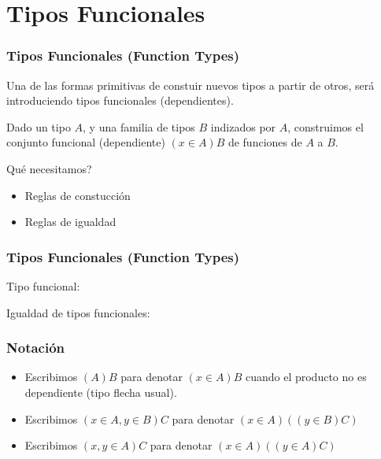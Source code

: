 \documentclass{beamer}
\begin{document}
\section{Tipos Funcionales}
\begin{frame}\frametitle{Tipos Funcionales (Function Types)}

  Una de las formas primitivas de constuir nuevos tipos a partir de otros,
  ser\'a introduciendo tipos funcionales \pause (dependientes).
  \pause

  Dado un tipo $A$, y una familia de tipos $B$ indizados por $A$,
  construimos el conjunto funcional (dependiente) $(x\in A)B$ de funciones de
  $A$ a $B$.

  \pause
  Qu\'e necesitamos?
  \pause
  \begin{itemize}
  \item
    Reglas de constucci\'on
  \item
    Reglas de igualdad
  \end{itemize}

\end{frame}

\begin{frame}\frametitle{Tipos Funcionales (Function Types)}
 Tipo funcional:
  \begin{prooftree}
  \end{prooftree}

  \pause

  Igualdad de tipos funcionales:
  \begin{prooftree}
  \end{prooftree}
\end{frame}

\begin{frame}\frametitle{Notaci\'on}
  \pause
  \begin{itemize}
  \item
    Escribimos $(A)B$ para denotar $(x\in A)B$ cuando el producto
    no es dependiente (tipo flecha usual).   
    \pause
  \item
    Escribimos $(x\in A, y \in B)C$ para denotar $(x\in A)((y \in B)C)$
    \pause
  \item
    Escribimos $(x, y \in A)C$ para denotar $(x\in A)((y \in A)C)$
 
  \end{itemize}
\end{frame}
\end{document}
